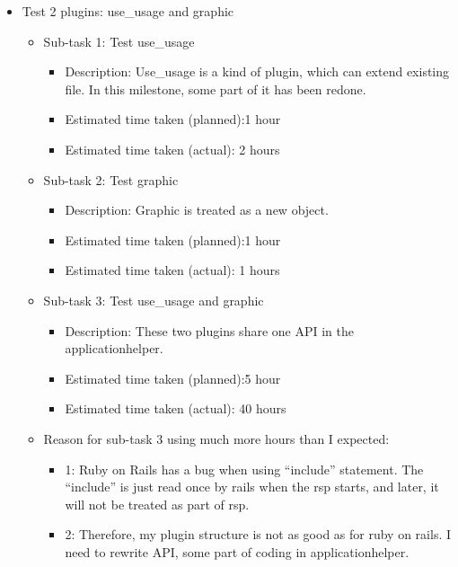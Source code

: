 \begin{itemize}
    \item Test 2 plugins: use\_usage and graphic
        \begin{itemize}
            \item Sub-task 1: Test use\_usage
                \begin{itemize}
                    \item Description:  Use\_usage is a kind of plugin, which can extend existing file. In this milestone, some part of it has been redone. 
                    \item Estimated time taken (planned):1 hour
                    \item Estimated time taken (actual): 2 hours
                \end{itemize}
            \item Sub-task 2: Test graphic
                \begin{itemize}
                    \item Description:  Graphic is treated as a new object.
                    \item Estimated time taken (planned):1 hour
                    \item Estimated time taken (actual): 1 hours
                \end{itemize}
            \item Sub-task 3: Test use\_usage and graphic
                \begin{itemize}
                    \item Description: These two plugins share one API in the applicationhelper.
                    \item Estimated time taken (planned):5 hour
                    \item Estimated time taken (actual): 40 hours
                \end{itemize}
            \item Reason for sub-task 3 using much more hours than I expected:
                \begin{itemize}
                    \item 1: Ruby on Rails has a bug when using ``include'' statement. The ``include'' is just read once by rails when the rsp starts, and later, it will not be treated as part of rsp.
                    \item 2: Therefore, my plugin structure is not as good as for ruby on rails. I need to rewrite	API, some part of coding in applicationhelper.

\end{itemize}
\end{itemize}
\end{itemize}
